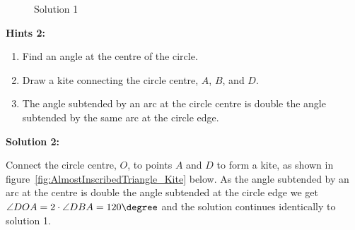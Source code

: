 \begin{figure}[H]
\begin{center}
\begin{subfigure}{0.49\textwidth}
			\caption{}
			\label{fig:AlmostInscribedTriangle_EquilaterialTriangle}
		\end{subfigure}
	\end{center}
	\caption{Solution 1}
\end{figure}

\textbf{Hints 2:}

\begin{enumerate}
	\item Find an angle at the centre of the circle.
	\item Draw a kite connecting the circle centre, $A$, $B$, and $D$.
	\item The angle subtended by an arc at the circle centre is double the angle subtended by the same arc at the circle edge.
\end{enumerate}

\textbf{Solution 2:}

Connect the circle centre, $O$, to points $A$ and $D$ to form a kite, as shown in figure~\ref{fig:AlmostInscribedTriangle_Kite} below. As the angle subtended by an arc at the centre is double the angle subtended at the circle edge we get $\angle DOA = 2 \cdot \angle DBA = 120\degree$ and the solution continues identically to solution 1.

